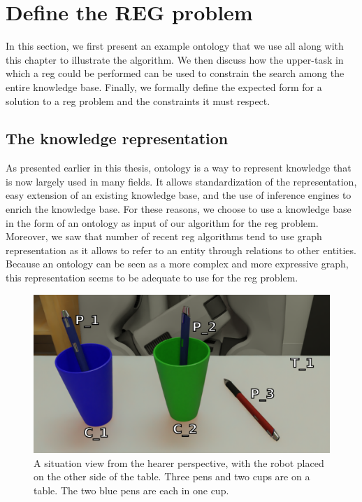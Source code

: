 \section{Define the REG problem}

In this section, we first present an example ontology that we use all along with this chapter to illustrate the algorithm. We then discuss how the upper-task in which a \acrshort{reg} could be performed can be used to constrain the search among the entire knowledge base. Finally, we formally define the expected form for a solution to a \acrshort{reg} problem and the constraints it must respect.


\subsection{The knowledge representation}
\label{sec:chap4_kb}

As presented earlier in this thesis, ontology is a way to represent knowledge that is now largely used in many fields. It allows standardization of the representation, easy extension of an existing knowledge base, and the use of inference engines to enrich the knowledge base. For these reasons, we choose to use a knowledge base in the form of an ontology as input of our algorithm for the \acrshort{reg} problem. Moreover, we saw that number of recent \acrshort{reg} algorithms tend to use graph representation as it allows to refer to an entity through relations to other entities. Because an ontology can be seen as a more complex and more expressive graph, this representation seems to be adequate to use for the \acrshort{reg} problem. 

\begin{figure}[ht!]
\centering
\includegraphics[scale=0.2]{figures/chapter4/pens.png}
\caption{\label{fig:chap4_kb} A situation view from the hearer perspective, with the robot placed on the other side of the table. Three pens and two cups are on a table. The two blue pens are each in one cup. }
\end{figure}

